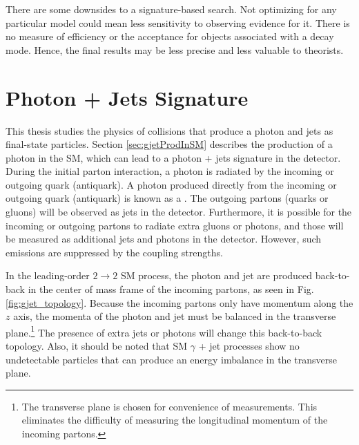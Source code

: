 There are some downsides to a signature-based search. Not optimizing for any particular model could mean less sensitivity to observing evidence for it. There is no measure of efficiency or the acceptance for objects associated with a decay mode. Hence, the final results may be less precise and less valuable to theorists.

\section{Photon + Jets Signature}
This thesis studies the physics of \ppbar collisions that produce a photon and jets as final-state particles. Section \ref{sec:gjetProdInSM} describes the production of a photon in the SM, which can lead to a photon + jets signature in the detector. During the initial parton interaction, a photon is radiated by the incoming or outgoing quark (antiquark). A photon produced directly from the incoming or outgoing quark (antiquark) is known as a . The outgoing partons (quarks or gluons) will be observed as jets in the detector. Furthermore, it is possible for the incoming or outgoing partons to radiate extra gluons or photons, and those will be measured as additional jets and photons in the detector. However, such emissions are suppressed by the coupling strengths.

In the leading-order $2\to2$ SM process, the photon and jet are produced back-to-back in the center of mass frame of the incoming partons, as seen in Fig. \ref{fig:gjet_topology}. Because the incoming partons only have momentum along the $z$ axis, the momenta of the photon and jet must be balanced in the transverse plane.\footnote{The transverse plane is chosen for convenience of measurements. This eliminates the difficulty of measuring the longitudinal momentum of the incoming partons.} The presence of extra jets or photons will change this back-to-back topology. Also, it should be noted that SM $\gamma$ + jet processes show no undetectable particles that can produce an energy imbalance in the transverse plane.

